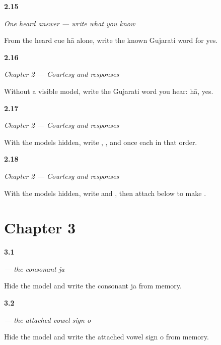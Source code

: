 \noindent\begin{minipage}[t]{\linewidth}
\raggedright
\hypertarget{review-GU-W01-haa-dictation-answer}{\textbf{2.15}} \emph{One heard answer — write what you know}\par
\small From the heard cue hā alone, write the known Gujarati word for yes.
\end{minipage}\par\medskip

\noindent\begin{minipage}[t]{\linewidth}
\raggedright
\hypertarget{review-GU-C01-practice-writing-payoff}{\textbf{2.16}} \emph{Chapter 2 — Courtesy and responses}\par
\small Without a visible model, write the Gujarati word you hear: hā, yes.
\end{minipage}\par\medskip

\noindent\begin{minipage}[t]{\linewidth}
\raggedright
\hypertarget{review-GU-C01-practice-four-consonants}{\textbf{2.17}} \emph{Chapter 2 — Courtesy and responses}\par
\small With the models hidden, write , ,  and  once each in that order.
\end{minipage}\par\medskip

\noindent\begin{minipage}[t]{\linewidth}
\raggedright
\hypertarget{review-GU-C01-practice-two-consonants-one-sign}{\textbf{2.18}} \emph{Chapter 2 — Courtesy and responses}\par
\small With the models hidden, write  and , then attach  below  to make .
\end{minipage}\par\medskip

\section*{Chapter 3}

\noindent\begin{minipage}[t]{\linewidth}
\raggedright
\hypertarget{review-GU-W03-ja-recall}{\textbf{3.1}} \emph{ — the consonant ja}\par
\small Hide the model and write the consonant ja from memory.
\end{minipage}\par\medskip

\noindent\begin{minipage}[t]{\linewidth}
\raggedright
\hypertarget{review-GU-W03-o-matra-recall}{\textbf{3.2}} \emph{ — the attached vowel sign o}\par
\small Hide the model and write the attached vowel sign o from memory.
\end{minipage}\par\medskip

